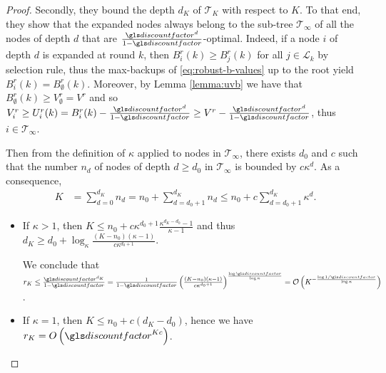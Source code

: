\begin{subappendices}
\begin{proof}
		Secondly, they bound the depth $d_K$ of $\mathcal{T}_K$ with respect to $K$. To that end, they show that the expanded nodes always belong to the sub-tree $\mathcal{T}_\infty$ of all the nodes of depth $d$ that are $\frac{\discount^d}{1-\discount}$-optimal. Indeed, if a node $i$ of depth $d$ is expanded at round $k$, then $B_i^r(k) \geq B_j^r(k)$ for all $j\in \mathcal{L}_k$ by selection rule, thus the max-backups of \eqref{eq:robust-b-values} up to the root yield $B^r_i(k) = B_\emptyset^r(k)$. Moreover, by Lemma \ref{lemma:uvb} we have that $B_\emptyset^r(k) \geq V_\emptyset^r = V^r$ and so $V_i^r \geq U_i^r(k) = B_i^r(k) - \frac{\discount^d}{1-\discount} \geq V^r - \frac{\discount^d}{1-\discount}$, thus $i \in \mathcal{T}_\infty$.
		
		Then from the definition of $\kappa$ applied to nodes in $\mathcal{T}_\infty$, there exists $d_0$ and $c$ such that the number $n_d$ of nodes of depth $d \geq d_0$ in $\mathcal{T}_\infty$ is bounded by $c\kappa^d$. As a consequence, 
		\begin{eqnarray*}
			K &= \sum_{d=0}^{d_K} n_d = n_0 + \sum_{d=d_0+1}^{d_K} n_d \leq n_0 + c\sum_{d={d_0+1}}^{d_K} \kappa^d.
		\end{eqnarray*}
		
		\begin{itemize}
			\item If $\kappa > 1$, then $K \leq n_0 + c\kappa^{d_0+1}\frac{\kappa^{d_K-d_0}-1}{\kappa-1}$ and thus $d_K \geq d_0 + \log_\kappa \frac{(K-n_0)(\kappa - 1)}{c\kappa^{d_0+1}}$.
			
			We conclude that $r_K \leq \frac{\discount^{d_K}}{1-\discount} = \frac{1}{1-\discount} \left( \frac{(K-n_0)(\kappa - 1)}{c\kappa^{d_0+1}} \right)^\frac{\log \discount}{\log \kappa} = \cO\left(K^{-\frac{\log 1/\discount}{\log \kappa}}\right)$.
			
			\item If $\kappa = 1$, then $K \leq n_0 + c(d_K-d_0)$, hence we have $r_K = O\left(\discount^{Kc}\right)$.
		\end{itemize}
	\end{proof}
	

\end{subappendices}

